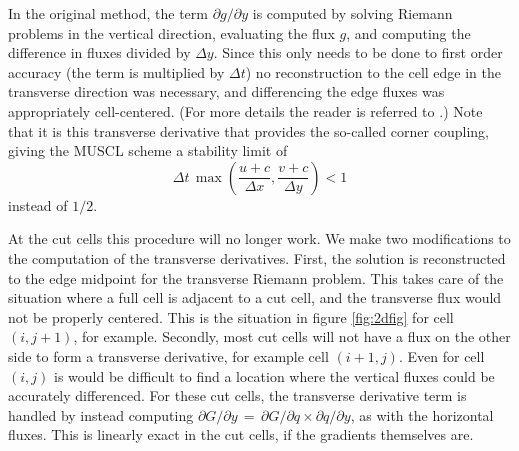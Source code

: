In the original method, the term $\partial g / \partial y$ is computed by solving Riemann
problems in the vertical direction,  evaluating the flux $g$, and computing the
difference in fluxes divided by $\Delta y$.
Since this only needs to be done to first order accuracy (the term is multiplied
by $\Delta t$)  no reconstruction to the cell edge  in the transverse 
direction was necessary,
and differencing the edge fluxes was appropriately cell-centered.
(For more details the reader is referred to \cite{Colella:Unsplit}.)
Note that it is this transverse derivative that provides the so-called corner coupling,
giving the MUSCL scheme a stability limit of
\begin{equation}
\label{eqn:bigcfllimit}
\Delta t \, \max \left (\frac{u+c}{\Delta x} , \frac{v+c}{\Delta y} \right) < 1
\end{equation}
instead of $1/2$.

At the cut cells this procedure will no longer work.   We make two modifications to the
computation of the transverse derivatives. First,
the solution is reconstructed to the edge midpoint  for the transverse Riemann problem.
This takes care of the situation where a full cell is adjacent to a cut cell, and
the transverse flux would not be properly centered. This is the situation
in figure \ref{fig:2dfig} for cell $(i,j+1)$, for example.
Secondly, most cut cells will not have a flux on the other side to form a
transverse derivative, for example cell $(i+1,j)$. Even for cell $(i,j)$ is would
be difficult to find a location where the vertical fluxes could be accurately differenced.
For these cut cells, the transverse derivative term is handled by instead computing
$ \partial G / \partial y \, = \,  \partial G / \partial q \times \partial q / \partial y$,
as with the horizontal fluxes. This is linearly exact in the cut cells, 
if the gradients themselves are.


